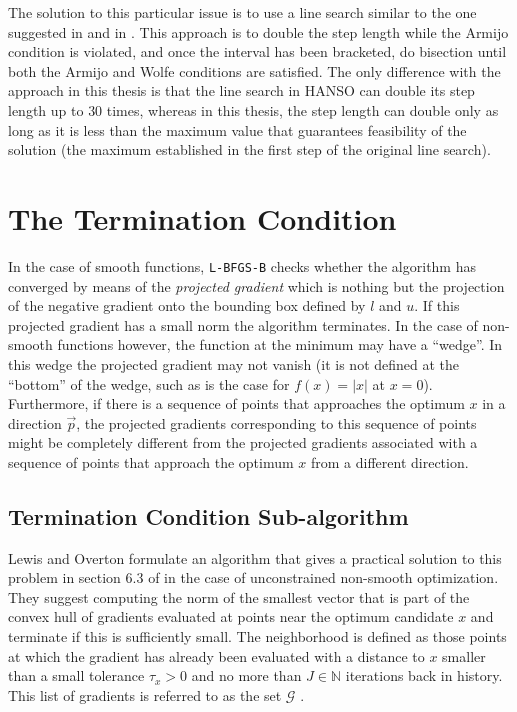 The solution to this particular issue is to use a line search similar to the one suggested in \citep{overtonlewis} and in \citep{hanso}. This approach is to double the step length while the Armijo condition is violated, and once the interval has been bracketed, do bisection until both the Armijo and Wolfe conditions are satisfied. The only difference with the approach in this thesis is that the line search in HANSO can double its step length up to $30$ times, whereas in this thesis, the step length can double only as long as it is less than the maximum value that guarantees feasibility of the solution (the maximum established in the first step of the original line search).

\section{The Termination Condition} \label{terminator}

In the case of smooth functions, \texttt{L-BFGS-B} checks whether the algorithm has converged by means of the \emph{projected gradient} which is nothing but the projection of the negative gradient onto the bounding box defined by $l$ and $u$. If this projected gradient has a small norm the algorithm terminates. In the case of non-smooth functions however, the function at the minimum may have a ``wedge''. In this wedge the projected gradient may not vanish (it is not defined at the ``bottom'' of the wedge, such as is the case for $f(x) = |x|$ at $x = 0$). Furthermore, if there is a sequence of points that approaches the optimum $x$ in a direction $\vec{p}$, the projected gradients corresponding to this sequence of points might be completely different from the projected gradients associated with a sequence of points that approach the optimum $x$ from a different direction.

\subsection{Termination Condition Sub-algorithm}
Lewis and Overton formulate an algorithm that gives a practical solution to this problem in section $6.3$ of \citep{overtonlewis}
in the case of unconstrained non-smooth optimization. They suggest computing the norm of the smallest vector that is part of the convex hull of gradients evaluated at points near the optimum candidate $x$ and terminate if this is sufficiently small. The neighborhood is defined as those points at which the gradient has already been evaluated with a distance to $x$ smaller than a small tolerance $\tau_x > 0$ and no more than $J \in \mathbb{N}$ iterations back in history. This list of gradients is referred to as the set $\mathcal{G}$ \citep{overtonlewis}.


